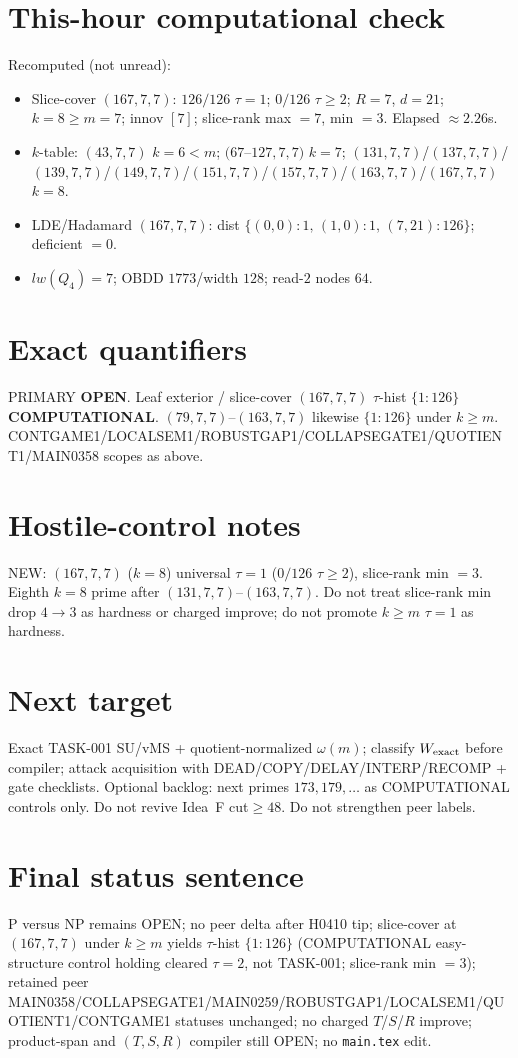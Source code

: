 \documentclass[11pt]{article}
\begin{document}
\section*{This-hour computational check}
Recomputed (not unread):
\begin{itemize}
\item Slice-cover $(167,7,7)$: $126/126$ $\tau{=}1$; $0/126$ $\tau{\ge}2$; $R{=}7$, $d{=}21$;
  $k{=}8{\ge}m{=}7$; innov $[7]$; slice-rank max $=7$, min $=3$. Elapsed $\approx2.26$s.
\item $k$-table: $(43,7,7)$ $k{=}6{<}m$; $(67$--$127,7,7)$ $k{=}7$;
  $(131,7,7)$/$(137,7,7)$/$(139,7,7)$/$(149,7,7)$/$(151,7,7)$/$(157,7,7)$/$(163,7,7)$/$(167,7,7)$ $k{=}8$.
\item LDE/Hadamard $(167,7,7)$: dist $\{(0,0){:}1,\,(1,0){:}1,\,(7,21){:}126\}$; deficient $=0$.
\item $lw(Q_4)=7$; OBDD $1773$/width $128$; read-$2$ nodes $64$.
\end{itemize}

\section*{Exact quantifiers}
PRIMARY \textbf{OPEN}. Leaf exterior / slice-cover $(167,7,7)$ $\tau$-hist $\{1{:}126\}$ \textbf{COMPUTATIONAL}.
$(79,7,7)$--$(163,7,7)$ likewise $\{1{:}126\}$ under $k{\ge}m$. CONTGAME1/LOCALSEM1/ROBUSTGAP1/COLLAPSEGATE1/QUOTIENT1/MAIN0358 scopes as above.

\section*{Hostile-control notes}
NEW: $(167,7,7)$ ($k{=}8$) universal $\tau{=}1$ ($0/126$ $\tau{\ge}2$), slice-rank min $=3$.
Eighth $k{=}8$ prime after $(131,7,7)$--$(163,7,7)$.
Do not treat slice-rank min drop $4\to3$ as hardness or charged improve;
do not promote $k{\ge}m$ $\tau{=}1$ as hardness.

\section*{Next target}
Exact TASK-001 SU/vMS + quotient-normalized $\omega(m)$; classify $W_{\rm exact}$ before compiler;
attack acquisition with DEAD/COPY/DELAY/INTERP/RECOMP + gate checklists.
Optional backlog: next primes $173,179,\ldots$ as COMPUTATIONAL controls only.
Do not revive Idea~F cut$\ge48$. Do not strengthen peer labels.

\section*{Final status sentence}
P versus NP remains OPEN; no peer delta after H0410 tip; slice-cover at $(167,7,7)$ under $k{\ge}m$ yields $\tau$-hist $\{1{:}126\}$ (COMPUTATIONAL easy-structure control holding cleared $\tau{=}2$, not TASK-001; slice-rank min $=3$); retained peer MAIN0358/COLLAPSEGATE1/MAIN0259/ROBUSTGAP1/LOCALSEM1/QUOTIENT1/CONTGAME1 statuses unchanged; no charged $T$/$S$/$R$ improve; product-span and $(T,S,R)$ compiler still OPEN; no \texttt{main.tex} edit.
\end{document}

